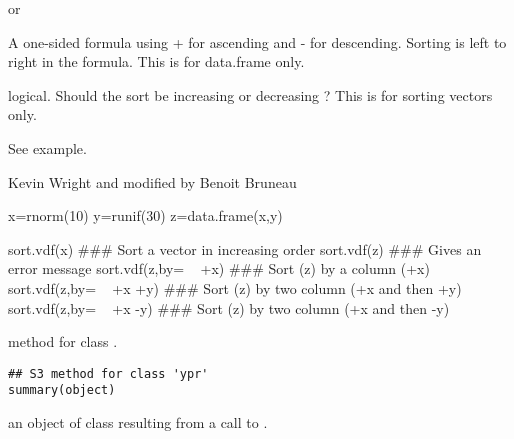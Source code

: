 \documentclass[a4paper]{book}
\begin{document}
%
\begin{Arguments}
\begin{ldescription}
\item[\code{x}]  or 
\item[\code{by}] A one-sided formula using + for ascending and - for descending. Sorting is left to right in the formula. This is for data.frame only.
\item[\code{increasing}] logical. Should the sort be increasing  or decreasing ? This is for sorting vectors only.

\end{ldescription}
\end{Arguments}
%
\begin{Details}\relax
See example.
\end{Details}
%
\begin{Author}\relax
Kevin Wright and modified by Benoit Bruneau
\end{Author}
%
\begin{Examples}
\begin{ExampleCode}
x=rnorm(10)
y=runif(30)
z=data.frame(x,y)

sort.vdf(x)                 ### Sort a vector in increasing order
sort.vdf(z)                 ### Gives an error message
sort.vdf(z,by= ~ +x)        ### Sort (z) by a column (+x)
sort.vdf(z,by= ~ +x +y)     ### Sort (z) by two column (+x and then +y)
sort.vdf(z,by= ~ +x -y)     ### Sort (z) by two column (+x and then -y)
\end{ExampleCode}
\end{Examples}
\newpage
{}
%
\begin{Description}\relax
{} method for class .
\end{Description}
%
\begin{Usage}
\begin{verbatim}
## S3 method for class 'ypr'
summary(object)
\end{verbatim}
\end{Usage}
%
\begin{Arguments}
\begin{ldescription}
\item[\code{object}] an object of class  resulting from a
call to .

\end{ldescription}
\end{Arguments}
\end{document}
